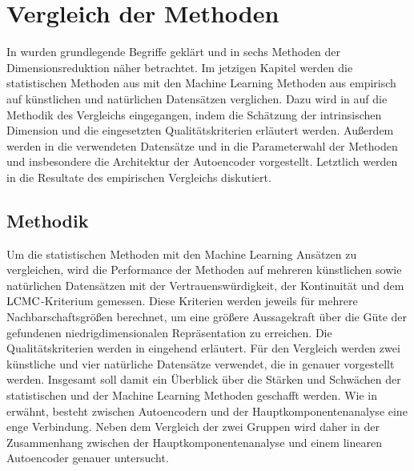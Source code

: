 \chapter{Vergleich der Methoden}
\label{ch:Vergleich}

In  wurden grundlegende Begriffe geklärt und in
 sechs Methoden der Dimensionsreduktion näher betrachtet. Im jetzigen
Kapitel werden die statistischen Methoden aus  mit den
Machine Learning Methoden aus  empirisch auf künstlichen und
natürlichen Datensätzen verglichen. Dazu wird in  auf die
Methodik des Vergleichs eingegangen, indem die Schätzung der intrinsischen Dimension und die
eingesetzten Qualitätskriterien erläutert werden. Außerdem werden in
 die verwendeten Datensätze und in
 die Parameterwahl der Methoden und
insbesondere die Architektur der Autoencoder vorgestellt. Letztlich werden in
 die Resultate des empirischen Vergleichs diskutiert.

\section{Methodik}
\label{ch:Vergleich:sec:Methodik}

Um die statistischen Methoden mit den Machine Learning Ansätzen zu vergleichen, wird die
Performance der Methoden auf mehreren künstlichen sowie natürlichen Datensätzen mit der
Vertrauenswürdigkeit, der Kontinuität und dem $\operatorname{LCMC}$-Kriterium gemessen. Diese Kriterien werden
jeweils für mehrere Nachbarschaftsgrößen berechnet, um eine größere Aussagekraft über die Güte der
gefundenen niedrigdimensionalen Repräsentation zu erreichen. Die Qualitätskriterien werden in
 eingehend erläutert. Für den
Vergleich werden zwei künstliche und vier natürliche Datensätze verwendet, die in
 genauer vorgestellt werden. Insgesamt soll damit
ein Überblick über die Stärken und Schwächen der statistischen und der Machine Learning Methoden
geschafft werden. Wie in  erwähnt, besteht
zwischen Autoencodern und der Hauptkomponentenanalyse eine enge Verbindung. Neben dem Vergleich der
zwei Gruppen wird daher in  der Zusammenhang zwischen der
Hauptkomponentenanalyse und einem linearen Autoencoder genauer untersucht.

